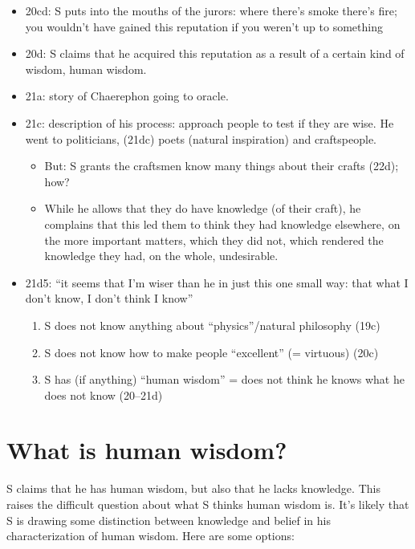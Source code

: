 \documentclass[oneside]{article}
\begin{document}
\begin{itemize}
\item 20cd: S puts into the mouths of the jurors: where there's smoke there's fire; you wouldn't have gained this reputation if you weren't up to something
\item 20d: S claims that he acquired this reputation as a result of a certain kind of wisdom, human wisdom.
\item	21a: story of Chaerephon going to oracle.
\item	21c: description of his process: approach people to test if they are wise. He went to politicians, (21dc) poets (natural inspiration) and craftspeople.
\begin{itemize} \item  But: S grants the craftsmen know many things about their crafts (22d); how? 
\item While he allows that they do have knowledge (of their craft), he complains that this led them to think they had knowledge elsewhere, on the more important matters, which they did not, which rendered the knowledge they had, on the whole, undesirable.
\end{itemize}
\item  21d5: ``it seems that I'm wiser than he in just this one small way: that what I don't know, I don't think I know''
\begin{enumerate}
\item S does not know anything about ``physics''/natural philosophy (19c)
\item S does not know how to make people ``excellent'' (= virtuous) (20c)
\item S has (if anything) ``human wisdom'' = does not think he knows what he does not know (20--21d)
\end{enumerate}
\end{itemize}


\section*{What is human wisdom?}
S claims that he has human wisdom, but also that he lacks knowledge. This raises the difficult question about what S thinks human wisdom is. It's likely that S is drawing some distinction between knowledge and belief in his characterization of human wisdom. Here are some options:
\end{document}
